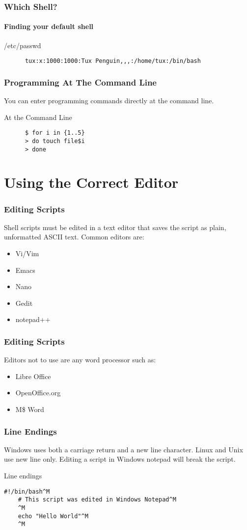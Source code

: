 \documentclass[handout]{beamer}
\begin{document}
\begin{frame}[fragile]
  \frametitle{Which Shell?}
  \framesubtitle{Finding your default shell}
  \begin{block}{/etc/passwd}
    \begin{verbatim}
      tux:x:1000:1000:Tux Penguin,,,:/home/tux:/bin/bash
    \end{verbatim}
  \end{block}
\end{frame}
\begin{frame}[fragile]
  \frametitle{Programming At The Command Line}
  You can enter programming commands directly at the command line.
   \begin{block}{At the Command Line}
    \begin{verbatim}
      $ for i in {1..5}
      > do touch file$i
      > done
    \end{verbatim}
   \end{block}
\end{frame}

\section{Using the Correct Editor}

\begin{frame}
  \frametitle{Editing Scripts}
  Shell scripts must be edited in a text editor that saves the script as plain, unformatted ASCII text. Common editors are:
  \begin{itemize}
  \item Vi/Vim
  \item Emacs
  \item Nano
  \item Gedit
  \item notepad++
  \end{itemize}
\end{frame}
\begin{frame}
  \frametitle{Editing Scripts}
  Editors not to use are any word processor such as:
  \begin{itemize}
  \item Libre Office
  \item OpenOffice.org
  \item M\$ Word
  \end{itemize}
\end{frame}
\begin{frame}[fragile]
  \frametitle{Line Endings}
  Windows uses both a carriage return and a new line character.  Linux and Unix use new line only.  Editing a script in Windows notepad will break the script.
  \begin{block}{Line endings}
\begin{verbatim}
#!/bin/bash^M
    # This script was edited in Windows Notepad^M
    ^M
    echo "Hello World"^M
    ^M
\end{verbatim}
  \end{block}
\end{frame}
\end{document}
